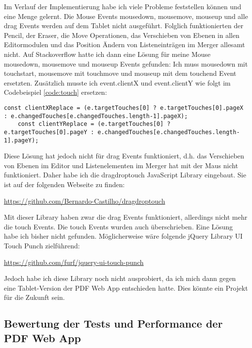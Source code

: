 Im Verlauf der Implementierung habe ich viele Probleme feststellen können und eine Menge gelernt. Die Mouse Events mousedown, mousemove, mouseup und alle drag Events werden auf dem Tablet nicht ausgeführt. Folglich funktionierten der Pencil, der Eraser, die Move Operationen, das Verschieben von Ebenen in allen Editormodulen und das Position Ändern von Listeneinträgen im Merger allesamt nicht. Auf Stackoverflow hatte ich dann eine Lösung für meine Mouse mousedown, mousemove und mouseup Events gefunden: Ich muss mousedown mit touchstart, mousemove mit touchmove und mouseup mit dem touchend Event ersetzten. Zusätzlich musste ich event.clientX und event.clientY wie folgt im Codebeispiel \ref{code:touch} ersetzen:

\begin{lstlisting}[style=ES6, caption={e.clientX und e.clientY Ersetzung}, label=code:touch, breaklines=true]
	const clientXReplace = (e.targetTouches[0] ? e.targetTouches[0].pageX : e.changedTouches[e.changedTouches.length-1].pageX);
	const clientYReplace = (e.targetTouches[0] ? e.targetTouches[0].pageY : e.changedTouches[e.changedTouches.length-1].pageY);
\end{lstlisting} 

Diese Lösung hat jedoch nicht für drag Events funktioniert, d.h. das Verschieben von Ebenen im Editor und Listenelementen im Merger hat mit der Maus nicht funktioniert. Daher habe ich die dragdroptouch JavaScript Library eingebaut. Sie ist auf der folgenden Webseite zu finden:

\url{https://github.com/Bernardo-Castilho/dragdroptouch}

Mit dieser Library haben zwar die drag Events funktioniert, allerdings nicht mehr die touch Events. Die touch Events wurden auch überschrieben. Eine Lösung habe ich bisher nicht gefunden. Möglicherweise wäre folgende jQuery Library UI Touch Punch zielführend:

\url{https://github.com/furf/jquery-ui-touch-punch}

Jedoch habe ich diese Library noch nicht ausprobiert, da ich mich dann gegen eine Tablet-Version der PDF Web App entschieden hatte. Dies könnte ein Projekt für die Zukunft sein.


\subsection{Bewertung der Tests und Performance der PDF Web App}


